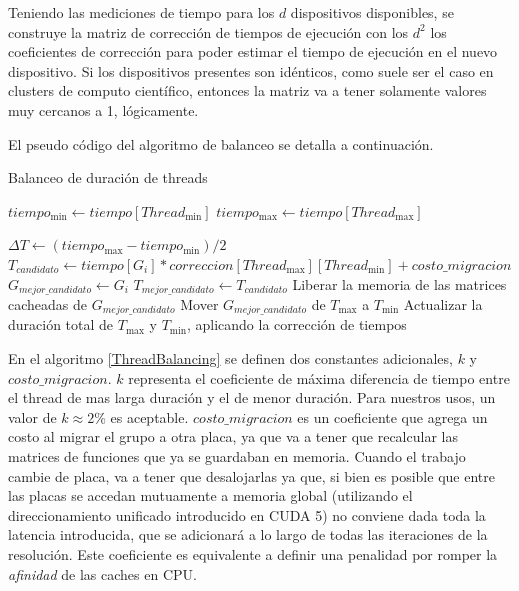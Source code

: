 Teniendo las mediciones de tiempo para los $d$ dispositivos disponibles, se construye la matriz de
correcci\'on de tiempos de ejecuci\'on con los $d^2$ los coeficientes de correcci\'on para poder estimar el tiempo de
ejecuci\'on en el nuevo dispositivo. Si los dispositivos presentes son id\'enticos, como suele ser el caso
en clusters de computo cient\'ifico, entonces
la matriz va a tener solamente valores muy cercanos a 1, l\'ogicamente.

El pseudo c\'odigo del algoritmo de balanceo se detalla a continuaci\'on.
\begin{algorithm}
  \caption{Balanceo de duraci\'on de threads}
  \label{ThreadBalancing}
\begin{algorithmic}
  \State $tiempo_{\min} \gets tiempo[Thread_{\min}]$
  \State $tiempo_{\max} \gets tiempo[Thread_{\max}]$

    \State $\Delta T \gets (tiempo_{\max} - tiempo_{\min}) /2$
    \State $T_{candidato} \gets  tiempo[G_i] * correccion[Thread_{\max}][Thread_{\min}] + costo\_migracion$
        \State $G_{mejor\_candidato} \gets G_i$
        \State $T_{mejor\_candidato} \gets T_{candidato}$
      \EndIf
    \EndFor
   \State Liberar la memoria de las matrices cacheadas de $G_{mejor\_candidato}$
   \State Mover $G_{mejor\_candidato}$ de $T_{\max}$ a $T_{\min}$
   \State Actualizar la duraci\'on total de $T_{\max}$ y $T_{\min}$, aplicando la correcci\'on de tiempos
  \EndWhile
\end{algorithmic}
\end{algorithm}

En el algoritmo \ref{ThreadBalancing} se definen dos constantes adicionales, $k$ y $costo\_migracion$.
$k$ representa el coeficiente de m\'axima diferencia de tiempo entre el thread de mas larga duraci\'on y el de menor
duraci\'on. Para nuestros usos, un valor de $k \approx 2\%$ es aceptable.
$costo\_migracion$ es un coeficiente que agrega un costo al migrar el grupo a otra placa, ya que va
a tener que recalcular las matrices de funciones que ya se guardaban en memoria. Cuando el trabajo cambie de placa, va a tener
que desalojarlas ya que, si bien es posible que entre las placas se accedan mutuamente a memoria global (utilizando
el direccionamiento unificado introducido en CUDA 5\cite{cudaProgrammingGuide})
no conviene dada toda la latencia introducida, que se adicionar\'a a lo largo de todas las iteraciones de la resoluci\'on.
Este coeficiente es equivalente a definir una penalidad por romper la \textit{afinidad} de las caches en CPU.

